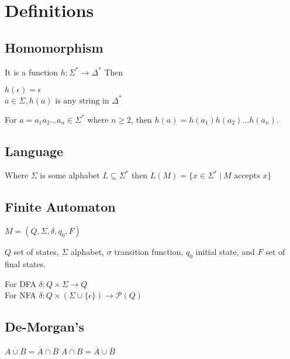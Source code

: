 \section{Definitions}
\subsection{Homomorphism}
It is a function
$h : \Sigma^* \to \Delta^*$ Then

$h(\epsilon) = \epsilon$ \\
$a\in\Sigma, h(a) \text{ is any string in } \Delta^*$

For $a=a_1a_2\dots a_n\in\Sigma^*$ where $n \geq 2$, then $h(a) = h(a_1)h(a_2)\dots h(a_n)$.

\subsection{Language}
Where $\Sigma$ is some alphabet $L \subseteq \Sigma^*$ then
$L(M) = \{x \in \Sigma^* ~|~ M \text{ accepts } x\}$

\subsection{Finite Automaton}
$M = \left(Q, \Sigma, \delta, q_0, F\right)$

$Q$ set of states, $\Sigma$ alphabet, $\sigma$ transition function, $q_0$ initial state, and $F$ set of final states.

For DFA $\delta: Q\times\Sigma \to Q$\\
For NFA $\delta: Q\times(\Sigma \cup \{\epsilon\}) \to \mathcal{P}(Q)$

\subsection{De-Morgan's}
$\overline{A \cup B} = \overline{A}\cap \overline{B}$
\hspace{4mm}
$\overline{A \cap B} = \overline{A}\cup \overline{B}$